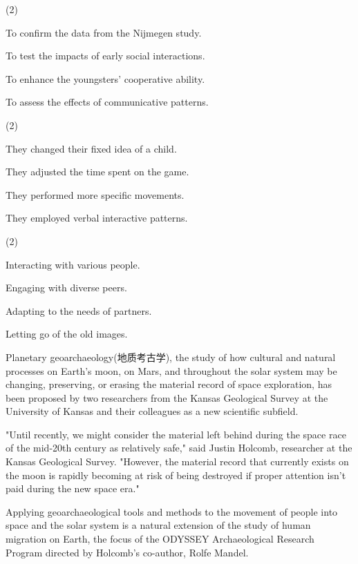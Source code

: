 \documentclass{英语试卷}
\begin{document}
\begin{choices}(2)
  \item To confirm the data from the Nijmegen study.
  \item To test the impacts of early social interactions.
  \item To enhance the youngsters' cooperative ability.
  \item To assess the effects of communicative patterns.
\end{choices}
\begin{choices}(2)
  \item They changed their fixed idea of a child.
  \item They adjusted the time spent on the game.
  \item They performed more specific movements.
  \item They employed verbal interactive patterns.
\end{choices}
\begin{choices}(2)
  \item Interacting with various people.
  \item Engaging with diverse peers.
  \item Adapting to the needs of partners.
  \item Letting go of the old images.
\end{choices}
\par Planetary geoarchaeology(地质考古学), the study of how cultural and natural processes on Earth's moon, on Mars, and throughout the solar system may be changing, preserving, or erasing the material record of space exploration, has been proposed by two researchers from the Kansas Geological Survey at the University of Kansas and their colleagues as a new scientific subfield.\par
\par "Until recently, we might consider the material left behind during the space race of the mid-20th century as relatively safe," said Justin Holcomb, researcher at the Kansas Geological Survey. "However, the material record that currently exists on the moon is rapidly becoming at risk of being destroyed if proper attention isn't paid during the new space era."\par
\par Applying geoarchaeological tools and methods to the movement of people into space and the solar system is a natural extension of the study of human migration on Earth, the focus of the ODYSSEY Archaeological Research Program directed by Holcomb's co-author, Rolfe Mandel.\par
\end{document}

